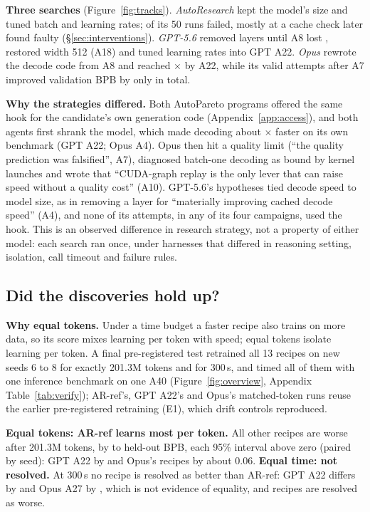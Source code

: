 \documentclass{article}
\begin{document}
 \textbf{Three searches} (Figure~\ref{fig:tracks}). \emph{AutoResearch} kept the model's size and tuned batch and learning rates; \CREightARFail{} of its 50 runs failed, mostly at a cache check later found faulty (\S\ref{sec:interventions}). \emph{GPT-5.6} removed layers until A8 lost \CREightAPEightWorse, restored width 512 (A18) and tuned learning rates into GPT A22. \emph{Opus} rewrote the decode code from A8 and reached \CREightOpTwentyTwoX$\times$ by A22, while its \CRThreeLateValid{} valid attempts after A7 improved validation BPB by only \CRThreeLateGain{} in total.

 \textbf{Why the strategies differed.} Both AutoPareto programs offered the same hook for the candidate's own generation code (Appendix~\ref{app:access}), and both agents first shrank the model, which made decoding about \CRNineGptDecX$\times$ faster on its own benchmark (GPT A22; Opus A4). Opus then hit a quality limit (``the quality prediction was falsified'', A7), diagnosed batch-one decoding as bound by kernel launches and wrote that ``CUDA-graph replay is the only lever that can raise speed without a quality cost'' (A10). GPT-5.6's hypotheses tied decode speed to model size, as in removing a layer for ``materially improving cached decode speed'' (A4), and none of its attempts, in any of its four campaigns, used the hook. This is an observed difference in research strategy, not a property of either model: each search ran once, under harnesses that differed in reasoning setting, isolation, call timeout and failure rules.

\subsection{Did the discoveries hold up?}\label{sec:verify}
 \textbf{Why equal tokens.} Under a time budget a faster recipe also trains on more data, so its score mixes learning per token with speed; equal tokens isolate learning per token. A final pre-registered test retrained all 13 recipes on new seeds 6 to 8 for exactly 201.3M tokens and for 300\,s, and timed all of them with one inference benchmark on one A40 (Figure~\ref{fig:overview}, Appendix Table~\ref{tab:verify}); AR-ref's, GPT A22's and Opus's matched-token runs reuse the earlier pre-registered retraining (E1), which drift controls reproduced.

 \textbf{Equal tokens: AR-ref learns most per token.} All \CRSixTokWorseCount{} other recipes are worse after 201.3M tokens, by \CRSixTokDLo{} to \CRSixTokDHi{} held-out BPB, each 95\% interval above zero (paired by seed): GPT A22 by \CRSixGptTokD{} and Opus's recipes by about 0.06. \textbf{Equal time: not resolved.} At 300\,s no recipe is resolved as better than AR-ref: GPT A22 differs by \CRSixGptTimeD{} \CRSixGptTimeCI{} and Opus A27 by \CRSixOpTwSevenTimeD{} \CRSixOpTwSevenTimeCI, which is not evidence of equality, and \CRSixTimeResolved{} recipes are resolved as worse.
\end{document}
